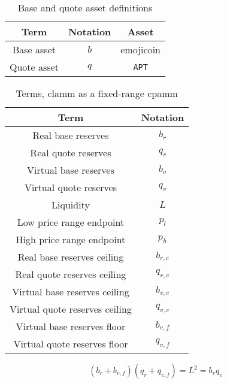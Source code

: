 \documentclass[table, twocolumn]{article}
\begin{document}
\begin{table}[!htb]
  \centering
  \begin{tabular}{|c|c|c|}
    \hline \rowcolor{blue}
    Term        & Notation & Asset        \\ \hline
    Base asset  & $b$      & emojicoin    \\ \hline
    Quote asset & $q$      & \texttt{APT} \\ \hline
  \end{tabular}
  \caption{Base and quote asset definitions}
  \label{tab:b-q-definitions}
\end{table}

\begin{table}[!htb]
  \centering
  \begin{tabular}{|c|c|}
    \hline \rowcolor{blue}
    Term                           & Notation  \\ \hline
    Real base reserves             & $b_r$     \\ \hline
    Real quote reserves            & $q_r$     \\ \hline
    Virtual base reserves          & $b_v$     \\ \hline
    Virtual quote reserves         & $q_v$     \\ \hline
    Liquidity                      & $L$       \\ \hline
    Low price range endpoint       & $p_l$     \\ \hline
    High price range endpoint      & $p_h$     \\ \hline
    Real base reserves ceiling     & $b_{r,c}$ \\ \hline
    Real quote reserves ceiling    & $q_{r,c}$ \\ \hline
    Virtual base reserves ceiling  & $b_{v,c}$ \\ \hline
    Virtual quote reserves ceiling & $q_{v,c}$ \\ \hline
    Virtual base reserves floor    & $b_{v,f}$ \\ \hline
    Virtual quote reserves floor   & $q_{v,f}$ \\ \hline
  \end{tabular}
  \caption{Terms, \gls*{clamm} as a fixed-range \gls*{cpamm}}
  \label{tab:clamm-curve-translation}
\end{table}

\begin{equation} \label{eqn:clamm-curve-translation}
  (b_r + b_{v, f})(q_r + q_{v, f}) = L^2 = b_v q_v
\end{equation}
\end{document}
